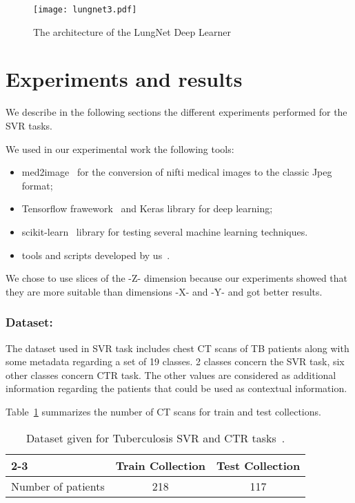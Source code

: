 \begin{figure}
\center
\texttt{[image: lungnet3.pdf]}
\caption{The architecture of the LungNet Deep Learner} 
\label{fig:lungnet}
\end{figure}

\section{Experiments and results}
We describe in the following sections the different experiments performed for the SVR tasks. 

We used in our experimental work the following tools:
\begin{itemize}
\item med2image~\cite{med2image} for the conversion of nifti medical images to the classic Jpeg format;
\item Tensorflow frawework~\cite{tensorflow} and Keras library for deep learning;
\item scikit-learn~\cite{scikit-learn} library for testing several machine learning techniques.
\item tools and scripts developed by us~\cite{anouargit}.
\end{itemize}

We chose to use slices of the -Z- dimension because our experiments showed that they are more suitable than dimensions -X- and -Y- and got better results.

\subsubsection{Dataset:}
The dataset used in SVR task includes chest CT scans of TB patients along with some metadata regarding a set of 19 classes. 2 classes concern the SVR task, six other classes concern CTR task. The other values are considered as additional information regarding the patients that could be used as contextual information.

Table~\ref{tab1} summarizes the number of CT scans for train and test collections.

\begin{table}
\center
\caption{Dataset given for Tuberculosis SVR and CTR tasks~\cite{ImageCLEF19}.}
\label{tab1}
\begin{tabular}{|l|c|c|}
\cline{2-3}
\multicolumn{1}{}{}  & 	\multicolumn{1}{|c|}{Train Collection}  &	\multicolumn{1}{|c|}{Test Collection}  \\
\hline
Number of patients 			&	218 					&		117\\
\hline
\end{tabular}
\end{table}

